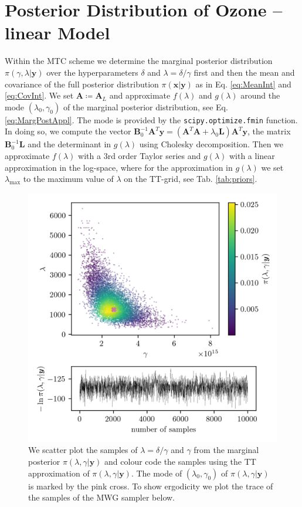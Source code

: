 \section{Posterior Distribution of Ozone -- linear Model}
\label{sec:FirstO3Post}
Within the MTC scheme we determine the marginal posterior distribution $\pi(\gamma, \lambda| \bm{y})$ over the hyperparameters $\delta$  and $\lambda = \delta / \gamma$ first and then the mean and covariance of the full posterior distribution $\pi(\bm{x}|\bm{y})$ as in Eq. \ref{eq:MeanInt} and \ref{eq:CovInt}.
We set $\bm{A} \coloneqq  \bm{A}_L$ and approximate $f(\lambda)$  and $g(\lambda)$ around the mode $( \lambda_{0}, \gamma_0 )$ of the marginal posterior distribution, see Eq. \ref{eq:MargPostAppl}.
The mode is provided by the \texttt{scipy.optimize.fmin} function.
In doing so, we compute the vector $\bm{B}_0^{-1}\bm{A}^T\bm{y} = (\bm{A}^T\bm{A} + \lambda_0 \bm{L})\bm{A}^T\bm{y} $, the matrix $\bm{B}_0^{-1}\bm{L}$ and the determinant in $g(\lambda)$ using Cholesky decomposition.
Then we approximate $f(\lambda)$ with a 3rd order Taylor series and $g(\lambda)$ with a linear approximation in the log-space, where for the approximation in $g(\lambda)$ we set $\lambda_{\text{max}}$ to the maximum value of $\lambda$ on the TT-grid, see Tab. \ref{tab:priors}.
\begin{figure}[ht!]
	\centering
	\includegraphics{ScatterplusHistoPlusTT.png}
	\caption[Scatter plot of samples from marginal posterior, including weighting from TT approximation; trace plot of the marginal posterior samples.]{We scatter plot the samples of $\lambda = \delta / \gamma $ and $\gamma$ from the marginal posterior $\pi(\lambda , \gamma  | \bm{y})$ and colour code the samples using the TT approximation of $\pi(\lambda , \gamma  | \bm{y})$. The mode of $(\lambda_0 , \gamma_0)$ of $\pi(\lambda , \gamma  | \bm{y})$ is marked by the pink cross. To show ergodicity we plot the trace of the samples of the MWG sampler below.}
	\label{fig:ScatterPlotTT}
\end{figure}


